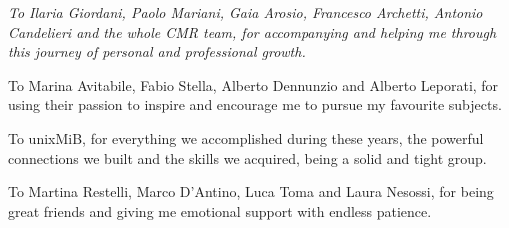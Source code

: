 \begin{flushright}
	\vspace*{50mm}
	\itshape
	To Ilaria Giordani, Paolo Mariani, Gaia Arosio, Francesco Archetti, Antonio Candelieri and the whole CMR team, for accompanying and helping me through this journey of personal and professional growth.
	
	\medskip
	To Marina Avitabile, Fabio Stella, Alberto Dennunzio and Alberto Leporati, for using their passion to inspire and encourage me to pursue my favourite subjects.
	
	\medskip
	To unixMiB, for everything we accomplished during these years, the powerful connections we built and the skills we acquired, being a solid and tight group.
	
	\medskip
	To Martina Restelli, Marco D'Antino, Luca Toma and Laura Nesossi, for being great friends and giving me emotional support with endless patience.

\end{flushright}

